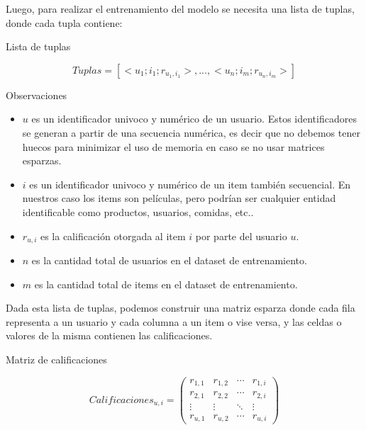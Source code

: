 \documentclass[11pt,a4paper,twoside]{thesis}
\begin{document}
Luego, para realizar el entrenamiento del modelo se necesita una lista de tuplas, donde cada tupla contiene:

\begin{description}
	\item[Lista de tuplas]
\end{description}
\begin{equation*}
	Tuplas = [<u_1; i_1; r_{u_1, i_1}>,...,<u_n; i_m; r_{u_n, i_m}>]
\end{equation*}
\begin{description}
	\item[Observaciones]
\end{description}
\begin{itemize}
	\item $u$ es un identificador univoco y numérico de un usuario. Estos identificadores se generan a partir de una secuencia numérica, es decir que no debemos tener huecos para minimizar el uso de memoria en caso se no usar matrices esparzas. 
	\item $i$ es un identificador univoco y numérico de un item también secuencial. En nuestros caso los items son películas, pero podrían ser cualquier entidad identificable como productos, usuarios, comidas, etc.. 
	\item $r_{u, i}$ es la calificación otorgada al item $i$ por parte del usuario $u$. 
 	\item $n$ es la cantidad total de usuarios en el dataset de entrenamiento. 
  	\item $m$ es la cantidad total de items en el dataset de entrenamiento. 
\end{itemize}

Dada esta lista de tuplas, podemos construir una matriz esparza donde cada fila representa a un usuario y cada columna a un item o vise versa, y 
las celdas o valores de la misma contienen las calificaciones.


\begin{description}
	\item[Matriz de calificaciones]
\end{description}
\begin{equation*}
	Calificaciones_{u,i} =
	\begin{pmatrix}
	r_{1,1} & r_{1,2} & \cdots & r_{1,i} \\
	r_{2,1} & r_{2,2} & \cdots & r_{2,i} \\
	\vdots  & \vdots  & \ddots & \vdots  \\
	r_{u,1} & r_{u,2} & \cdots & r_{u,i}
	\end{pmatrix}
\end{equation*}
\end{document}

